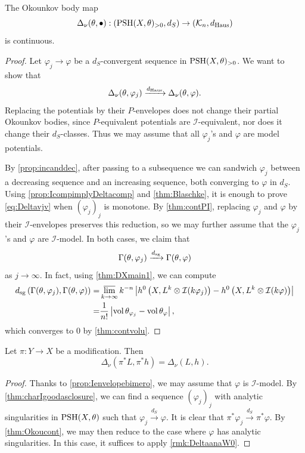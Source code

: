 \begin{theorem}\label{thm:Okoucont}
	The Okounkov body map
	\[
		\Delta_{\nu}(\theta,\bullet):\left( \mathrm{PSH}(X,\theta)_{>0},d_S\right)\rightarrow \left(\mathcal{K}_n,d_{\mathrm{Haus}}\right)
	\]
	is continuous.
\end{theorem}

\begin{proof}
Let $\varphi_j\to \varphi$ be a $d_S$-convergent sequence in $\mathrm{PSH}(X,\theta)_{>0}$.
	We want to show that
	\begin{equation}\label{eq:Deltavjv}
		\Delta_{\nu}(\theta,\varphi_j)\xrightarrow{d_{\mathrm{Haus}}}\Delta_{\nu}(\theta,\varphi).
	\end{equation}
	Replacing the potentials by their $P$-envelopes does not change their partial Okounkov bodies, since $P$-equivalent potentials are $\mathcal{I}$-equivalent, nor does it change their $d_S$-classes. Thus we may assume that all $\varphi_j$'s and $\varphi$ are model potentials.

	By \cref{prop:incanddec}, after passing to a subsequence we can sandwich $\varphi_j$ between a decreasing sequence and an increasing sequence, both converging to $\varphi$ in $d_S$. Using \cref{prop:IcompimplyDeltacomp} and \cref{thm:Blaschke}, it is enough to prove \eqref{eq:Deltavjv} when $(\varphi_j)_j$ is monotone. By \cref{thm:contPI}, replacing $\varphi_j$ and $\varphi$ by their $\mathcal{I}$-envelopes preserves this reduction, so we may further assume that the $\varphi_j$'s and $\varphi$ are $\mathcal{I}$-model.
 In both cases, we claim that
 \[
 \Gamma(\theta,\varphi_j)\xrightarrow{d_{\mathrm{sg}}} \Gamma(\theta,\varphi)
 \]
 as $j\to\infty$.
 In fact, using \cref{thm:DXmain1}, we can compute
 \[
 \begin{aligned}
 d_{\mathrm{sg}}\left(\Gamma(\theta,\varphi_j), \Gamma(\theta,\varphi)\right) = &\varlimsup_{k\to\infty} k^{-n}\left| h^0\left(X,L^k\otimes \mathcal{I}(k\varphi_j)\right)-h^0\left(X,L^k\otimes \mathcal{I}(k\varphi)\right) \right|\\
 =& \frac{1}{n!} \left| \operatorname{vol} \theta_{\varphi_j}-\operatorname{vol} \theta_{\varphi}\right|,
 \end{aligned}
 \]
 which converges to $0$ by \cref{thm:contvolu}.
\end{proof}

\begin{proposition}\label{prop:birinvO}
	Let $\pi \colon Y\rightarrow X$ be a modification. Then
	\[
		\Delta_{\nu}(\pi^*L,\pi^*h)=\Delta_{\nu}(L,h).
	\]
\end{proposition}
\begin{proof}
    Thanks to \cref{prop:Ienvelopebimero}, we may assume that $\varphi$ is $\mathcal{I}$-model.
   By \cref{thm:charIgoodasclosure}, we can find a sequence $(\varphi_j)_j$ with analytic singularities in $\mathrm{PSH}(X,\theta)$ such that $\varphi_j\xrightarrow{d_S}\varphi$. It is clear that $\pi^*\varphi_j\xrightarrow{d_S}\pi^*\varphi$.
    By \cref{thm:Okoucont}, we may then reduce to the case where $\varphi$ has analytic singularities. In this case, it suffices to apply \cref{rmk:DeltaanaW0}.
\end{proof}


